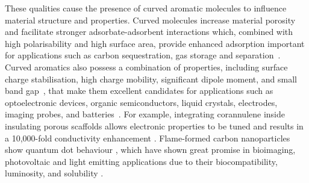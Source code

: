These qualities cause the presence of curved aromatic molecules to influence material structure and properties. Curved molecules increase material porosity \cite{Harris2005new} and facilitate stronger adsorbate-adsorbent interactions \cite{Martin2017} which, combined with high polarisability and high surface area, provide enhanced adsorption important for applications such as carbon sequestration, gas storage and separation~\cite{Scanlon2006investigation}. Curved aromatics also possess a combination of properties, including surface charge stabilisation, high charge mobility, significant dipole moment, and small band gap~\cite{Menon2019optical}, that make them excellent candidates for applications such as optoelectronic devices, organic semiconductors, liquid crystals, electrodes, imaging probes, and batteries~\cite{roch2017indenocorannulene}. For example, integrating corannulene inside insulating porous scaffolds allows electronic properties to be tuned and results in a 10,000-fold conductivity enhancement \cite{rice2018stack}. Flame-formed carbon nanoparticles show quantum dot behaviour \cite{liu2019flame}, which have shown great promise in bioimaging, photovoltaic and light emitting applications due to their biocompatibility, luminosity, and solubility \cite{zhang2012graphene}.

